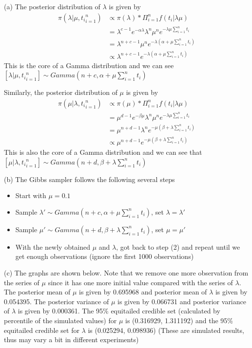 \documentclass{homeworg}
\begin{document}
(a) The posterior distribution of $\lambda$ is given by 
\begin{align*}
\pi(\lambda|\mu,{t_i}_{i=1}^n) & \propto \pi(\lambda)*\Pi_{i=1}^{n} f(t_i|\lambda\mu)\\
& =\lambda^{c-1}e^{-\alpha\lambda} \lambda^n \mu^n e^{-\lambda\mu\sum_{i=1}^nt_i}\\
&=\lambda^{n+c-1}\mu^{n} e^{-\lambda(\alpha+\mu\sum_{i=1}^nt_i)} \\
&\propto \lambda^{n+c-1} e^{-\lambda(\alpha+\mu\sum_{i=1}^nt_i)}
\end{align*}
This is the core of a Gamma distribution and we can see $[\lambda|\mu,{t_i}_{i=1}^n]\sim Gamma(n+c,\alpha+\mu\sum_{i=1}^nt_i)$

Similarly, the posterior distribution of $\mu$ is given by 
\begin{align*}
\pi(\mu|\lambda,{t_i}_{i=1}^n) & \propto \pi(\mu)*\Pi_{i=1}^{n} f(t_i|\lambda\mu)\\
& =\mu^{d-1}e^{-\beta\mu} \lambda^n \mu^n e^{-\lambda\mu\sum_{i=1}^nt_i}\\
&=\mu^{n+d-1}\lambda^{n} e^{-\mu(\beta+\lambda\sum_{i=1}^nt_i)} \\
&\propto \mu^{n+d-1} e^{-\mu(\beta+\lambda\sum_{i=1}^nt_i)} 
\end{align*}
This is also the core of a Gamma distribution and we can see that $[\mu|\lambda,{t_i}_{i=1}^n]\sim Gamma(n+d,\beta+\lambda\sum_{i=1}^nt_i)$

(b) The Gibbs sampler follows the following several steps
\begin{itemize}
\item Start with $\mu=0.1$
\item Sample $\lambda'\sim Gamma(n+c,\alpha+\mu\sum_{i=1}^nt_i)$, set $\lambda=\lambda'$
\item Sample $\mu'\sim Gamma(n+d,\beta+\lambda\sum_{i=1}^nt_i)$, set $\mu=\mu'$
\item With the newly obtained $\mu$ and $\lambda$, got back to step (2) and repeat until we get enough observations (ignore the first 1000 observations)
\end{itemize}

(c) The graphs are shown below. Note that we remove one more observation from the series of $\mu$ since it has one more initial value compared with the series of $\lambda$. The posterior mean of $\mu$ is given by  0.695968
 and posterior mean of $\lambda$ is given by 0.054395. The posterior variance of $\mu$ is given by 0.066731 and posterior variance of $\lambda$ is given by 0.000361.  The 95\% equitailed credible set (calculated by percentile of the simulated values) for $\mu$ is (0.316929, 1.311192) and the 95\% equitailed credible set for $\lambda$ is (0.025294, 0.098936) (These are simulated results, thus may vary a bit in different experiments)
\end{document}
